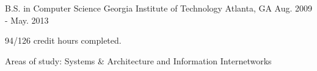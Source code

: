 

\begin{cventries}

  \cventry
    {B.S. in Computer Science} %
    {Georgia Institute of Technology} %
    {Atlanta, GA} %
    {Aug. 2009 - May. 2013} %
    {
      \begin{cvitems} %
        \item {94/126 credit hours completed.}
        \item {Areas of study: Systems \& Architecture and Information Internetworks}
      \end{cvitems}
    }

\end{cventries}
